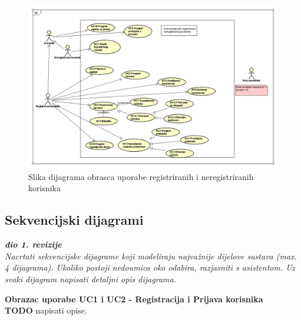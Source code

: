 \begin{figure}[H]
	\includegraphics[width=.9\linewidth]{slike/DOU1.PNG}
	\caption{Slika dijagrama obrasca uporabe registriranih i neregistriranih korisnika}
	\label{fig:dou1}
\end{figure}

\subsection{Sekvencijski dijagrami}

\textbf{\textit{dio 1. revizije}}\\

\textit{Nacrtati sekvencijske dijagrame koji modeliraju najvažnije dijelove sustava (max. 4 dijagrama). Ukoliko postoji nedoumica oko odabira, razjasniti s asistentom. Uz svaki dijagram napisati detaljni opis dijagrama.}
\eject

\textbf{Obrazac uporabe UC1 i UC2 - Registracija i Prijava korisnika}\\

\textbf{TODO} napisati opise.


